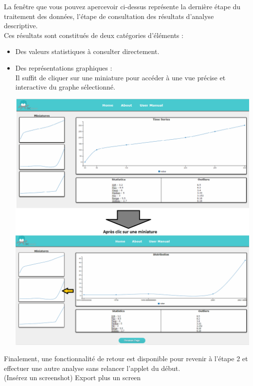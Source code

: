 		La fenêtre que vous pouvez apercevoir ci-dessus représente la dernière étape du traitement des données, l'étape de consultation des résultats d'analyse descriptive.\\
		Ces résultats sont constitués de deux catégories d'éléments :
		\begin{itemize}
			\item Des valeurs statistiques à consulter directement.
			\item Des représentations graphiques :\\
				Il suffit de cliquer sur une miniature pour accéder à une vue précise et interactive du graphe sélectionné.\\
			\begin{center}\includegraphics[scale=0.40]{fenetre3-2.png}\end{center}		
		\end{itemize}
		Finalement, une fonctionnalité de retour est disponible pour revenir à l'étape 2 et effectuer une autre analyse sans relancer l'applet du début.\\
			(Insérez un screenshot)
		Export plus un screen
		

